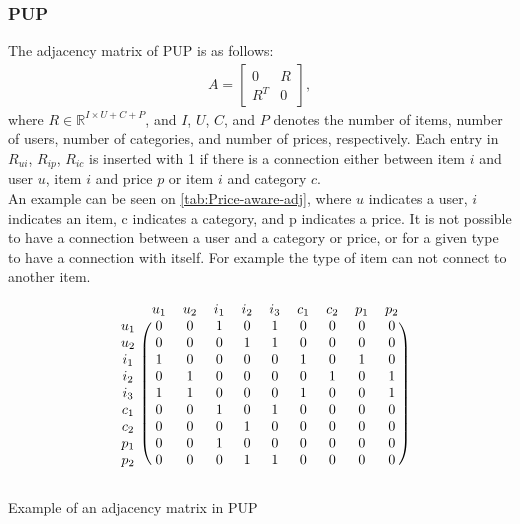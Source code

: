 \subsubsection{PUP}
The adjacency matrix of PUP is as follows:
\begin{gather}
    A =
    \begin{bmatrix}
        0   & R \\
        R^T & 0
    \end{bmatrix},
\end{gather}
where $R \in \mathbb{R}^{I \times U+C+P}$, and $I$, $U$, $C$, and $P$ denotes the number of items, number of users, number of categories, and number of prices, respectively.
Each entry in $R_{ui}$, $R_{ip}$, $R_{ic}$ is inserted with 1 if there is a connection either between item $i$ and user $u$, item $i$ and price $p$ or item $i$ and category $c$.\\
An example can be seen on \autoref{tab:Price-aware-adj}, where $u$ indicates a user, $i$ indicates an item, c indicates a category, and p indicates a price.
It is not possible to have a connection between a user and a category or price, or for a given type to have a connection with itself.
For example the type of item can not connect to another item.
\begin{table}
    \[
        \begin{blockarray}{cccccccccc}
            & u_1 & u_2 & i_1 & i_2 & i_3 & c_1 & c_2 & p_1 & p_2 \\
            \begin{block}{c(ccccccccc)}
                u_1 & 0 & 0 & 1 & 0 & 1 & 0 & 0 & 0 & 0   \\
                u_2 & 0 & 0 & 0 & 1 & 1 & 0 & 0 & 0 & 0  \\
                i_1 & 1 & 0 & 0 & 0 & 0 & 1 & 0 & 1 & 0  \\
                i_2 & 0 & 1 & 0 & 0 & 0 & 0 & 1 & 0 & 1  \\
                i_3 & 1 & 1 & 0 & 0 & 0 & 1 & 0 & 0 & 1  \\
                c_1 & 0 & 0 & 1 & 0 & 1 & 0 & 0 & 0 & 0  \\
                c_2 & 0 & 0 & 0 & 1 & 0 & 0 & 0 & 0 & 0  \\
                p_1 & 0 & 0 & 1 & 0 & 0 & 0 & 0 & 0 & 0  \\
                p_2 & 0 & 0 & 0 & 1 & 1 & 0 & 0 & 0 & 0  \\
            \end{block}
        \end{blockarray}
    \]
    \caption{Example of an adjacency matrix in PUP}
    \label{tab:Price-aware-adj}
\end{table}
